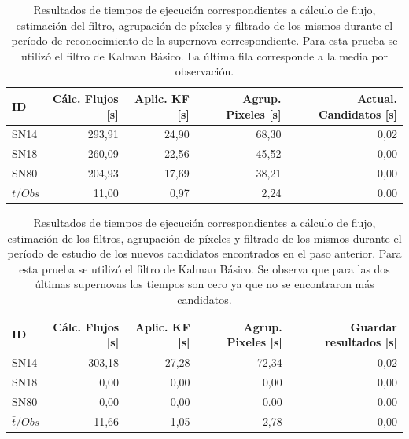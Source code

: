 \begin{table}[h!]
\centering
\caption{Resultados de tiempos de ejecuci\'on correspondientes a c\'alculo de flujo, estimaci\'on del filtro, agrupaci\'on de p\'ixeles y filtrado de los mismos durante el per\'iodo de reconocimiento de la supernova correspondiente. Para esta prueba se utiliz\'o el filtro de Kalman B\'asico. La \'ultima fila corresponde a la media por observaci\'on.}
\begin{tabular}{|l|r|r|r|r|}
\hline
\textbf{ID} & \textbf{C\'alc. Flujos [s]} & \textbf{Aplic. KF [s]} &  \textbf{Agrup. Pixeles [s]}  & \textbf{Actual. Candidatos [s]}\\ \hline \hline
SN14        & 293,91            & 24,90        &  68,30 & 0,02 \\ \hline
SN18            & 260,09             & 22,56         &  45,52  & 0,00\\ \hline
SN80            & 204,93             & 17,69         &   38,21 & 0,00 \\ \hline \hline
$\bar{t}/Obs$ & 11,00 &  0,97 & 2,24 & 0,00\\\hline 
\end{tabular}
\label{tab:t1}
\end{table}

\begin{table}[h!]
\centering
\caption{Resultados de tiempos de ejecuci\'on correspondientes a c\'alculo de flujo, estimaci\'on de los filtros, agrupaci\'on de p\'ixeles y filtrado de los mismos durante el per\'iodo de estudio de los nuevos candidatos encontrados en el paso anterior. Para esta prueba se utiliz\'o el filtro de Kalman B\'asico. Se observa que para las dos \'ultimas supernovas los tiempos son cero ya que no se encontraron m\'as candidatos.}
\begin{tabular}{|l|r|r|r|r|}
\hline
\textbf{ID} & \textbf{C\'alc. Flujos [s]} & \textbf{Aplic. KF [s]} &  \textbf{Agrup. Pixeles [s]}  & \textbf{Guardar resultados [s]}\\ \hline \hline
SN14        & 303,18            & 27,28        &  72,34 & 0,02 \\ \hline
SN18            & 0,00             & 0,00         &  0,00  & 0,00\\ \hline
SN80            & 0,00             & 0,00         &   0.00 & 0,00 \\ \hline\hline 
$\bar{t}/Obs$ & 11,66 &  1,05 & 2,78 & 0,00\\\hline 
\end{tabular}
\label{tab:t2}
\end{table}

